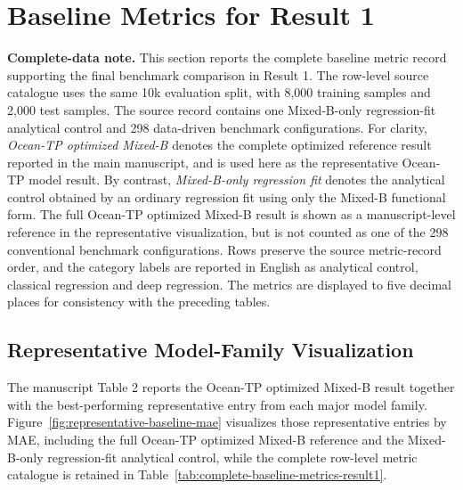 \documentclass[10pt]{article}
\begin{document}
\clearpage
\section{Baseline Metrics for Result 1}
\label{sec:baseline-metrics-result1}

\noindent\textcolor{noteRed}{\textbf{Complete-data note.}}
This section reports the complete baseline metric record supporting the final benchmark comparison in Result 1.
The row-level source catalogue uses the same 10k evaluation split, with 8,000 training samples and 2,000 test samples.
The source record contains one Mixed-B-only regression-fit analytical control and 298 data-driven benchmark configurations.
For clarity, \textit{Ocean-TP optimized Mixed-B} denotes the complete optimized reference result reported in the main manuscript, and is used here as the representative Ocean-TP model result.
By contrast, \textit{Mixed-B-only regression fit} denotes the analytical control obtained by an ordinary regression fit using only the Mixed-B functional form.
The full Ocean-TP optimized Mixed-B result is shown as a manuscript-level reference in the representative visualization, but is not counted as one of the 298 conventional benchmark configurations.
Rows preserve the source metric-record order, and the category labels are reported in English as analytical control, classical regression and deep regression.
The metrics are displayed to five decimal places for consistency with the preceding tables.

\subsection{Representative Model-Family Visualization}

\noindent
The manuscript Table 2 reports the Ocean-TP optimized Mixed-B result together with the best-performing representative entry from each major model family.
Figure~\ref{fig:representative-baseline-mae} visualizes those representative entries by MAE, including the full Ocean-TP optimized Mixed-B reference and the Mixed-B-only regression-fit analytical control, while the complete row-level metric catalogue is retained in Table~\ref{tab:complete-baseline-metrics-result1}.
\end{document}
